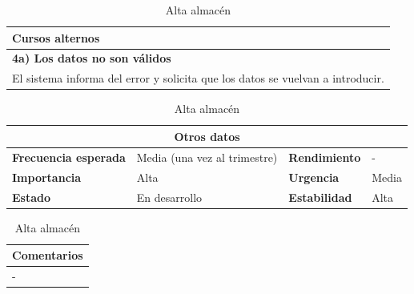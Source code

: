 \documentclass[12pt,spanish]{article}
\begin{document}
\begin{table}[H]
\vspace{1cm}

\begin{tabular}{|m{10pt}|m{7.15cm}|m{10pt}|m{7.15cm}|}
\hline
\multicolumn{4}{|m{16.2cm}|}{\textbf{Cursos alternos}} \\
\hline
\multicolumn{4}{|m{16.2cm}|}{\textbf{4a) Los datos no son válidos}} \\
\hline
\multicolumn{4}{|m{16.2cm}|}{El sistema informa del error y solicita que los datos se vuelvan a introducir.} \\
\hline
\end{tabular}

\vspace{1cm}

\begin{tabular}{|m{3.72cm}|m{3.72cm}|m{3.72cm}|m{3.72cm}|}
\hline
\multicolumn{4}{|c|}{\textbf{Otros datos}} \\
\hline
\textbf{Frecuencia esperada} & Media (una vez al trimestre) & \textbf{Rendimiento} & - \\
\hline
\textbf{Importancia} & Alta & \textbf{Urgencia} & Media \\
\hline
\textbf{Estado} & En desarrollo & \textbf{Estabilidad} & Alta \\
\hline
\end{tabular}

\vspace{1cm}

\begin{tabular}{|m{16.2cm}|}
\hline
\textbf{Comentarios} \\
\hline
- \\
\hline
\end{tabular}

\caption{Alta almacén}

\end{table}


\end{document}
